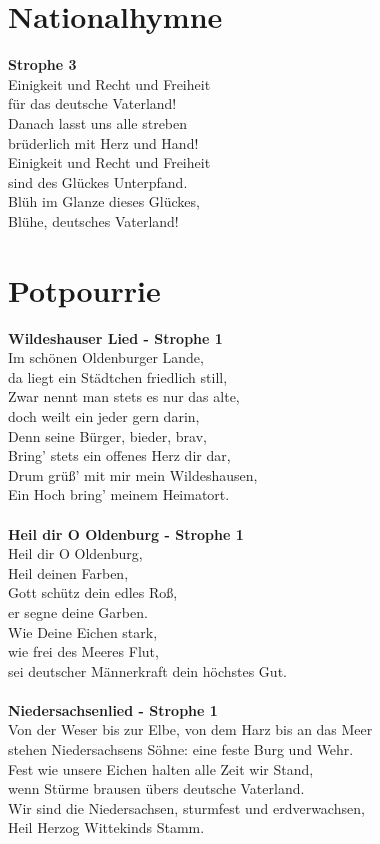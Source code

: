 \documentclass[twoside,8pt]{scrartcl}
\begin{document}
\clearpage
\section{Nationalhymne}
\textbf{Strophe 3}\\
Einigkeit und Recht und Freiheit\\
für das deutsche Vaterland!\\
Danach lasst uns alle streben\\
brüderlich mit Herz und Hand!\\
Einigkeit und Recht und Freiheit\\
sind des Glückes Unterpfand.\\
Blüh im Glanze dieses Glückes,\\
Blühe, deutsches Vaterland!

\clearpage
\section{Potpourrie}
\textbf{Wildeshauser Lied - Strophe 1}\\
Im schönen Oldenburger Lande,\\
da liegt ein Städtchen friedlich still,\\
Zwar nennt man stets es nur das alte,\\
doch weilt ein jeder gern darin,\\
Denn seine Bürger, bieder, brav,\\
Bring' stets ein offenes Herz dir dar,\\
Drum grüß' mit mir mein Wildeshausen,\\
Ein Hoch bring' meinem Heimatort.\\\\
\textbf{Heil dir O Oldenburg - Strophe 1}\\
Heil dir O Oldenburg,\\
Heil deinen Farben,\\
Gott schütz dein edles Roß,\\
er segne deine Garben. \\
Wie Deine Eichen stark,\\
wie frei des Meeres Flut,\\
sei deutscher Männerkraft dein höchstes Gut.\\\\
\textbf{Niedersachsenlied - Strophe 1}\\
Von der Weser bis zur Elbe, von dem Harz bis an das Meer\\
stehen Niedersachsens Söhne: eine feste Burg und Wehr.\\
Fest wie unsere Eichen halten alle Zeit wir Stand,\\
wenn Stürme brausen übers deutsche Vaterland.\\
Wir sind die Niedersachsen, sturmfest und erdverwachsen,\\
Heil Herzog Wittekinds Stamm.\\
\end{document}
